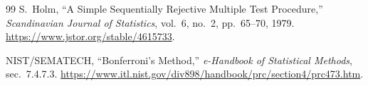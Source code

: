 \begin{thebibliography}{99}
S.~Holm, ``A Simple Sequentially Rejective Multiple Test Procedure,'' \emph{Scandinavian Journal of Statistics}, vol.~6, no.~2, pp.~65--70, 1979. \url{https://www.jstor.org/stable/4615733}.

NIST/SEMATECH, ``Bonferroni's Method,'' \emph{e-Handbook of Statistical Methods}, sec.~7.4.7.3. \url{https://www.itl.nist.gov/div898/handbook/prc/section4/prc473.htm}.

\end{thebibliography}
